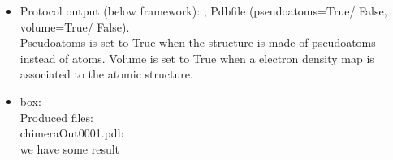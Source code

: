 \begin{itemize}
   \begin{itemize}
     \item Protocol output (below \scipion framework): ; Pdbfile (pseudoatoms=True/ False, volume=True/ False).\\Pseudoatoms is set to True when the structure is made of pseudoatoms instead of atoms. Volume is set to True when a electron density map is associated to the atomic structure.\\
     \item {} box:\\Produced files:\\chimeraOut0001.pdb\\we have some result\\
    \end{itemize}
  
 \end{itemize}

